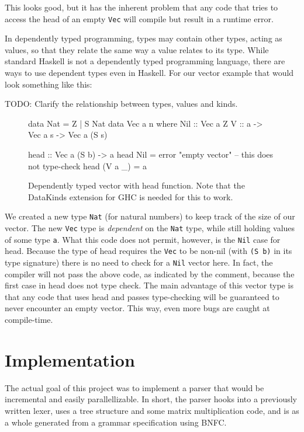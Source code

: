 \documentclass[a4paper,12pt,twosided]{report}
\begin{document}
This looks good, but it has the inherent problem that any code that tries to
access the head of an empty \texttt{Vec} will compile but result in a runtime error. 

In dependently typed programming, types may contain other types, acting as
values, so that they relate the same way a value relates to its type. While
standard Haskell is not a dependently typed programming language, there are ways
to use dependent types even in Haskell. For our vector example that would look
something like this:

TODO: Clarify the relationship between types, values and kinds. 
\begin{figure}[H]
\begin{code}
data Nat = Z | S Nat
data Vec a n where
    Nil :: Vec a Z
    V :: a -> Vec a s -> Vec a (S s)

head :: Vec a (S b) -> a
head Nil = error "empty vector" -- this does not type-check
head (V a _) = a
\end{code}
\caption{Dependently typed vector with head function. Note that the DataKinds
extension for GHC is needed for this to work.}
\end{figure}

We created a new type \texttt{Nat} (for natural numbers) to keep track of the
size of our vector. The new \texttt{Vec} type is \textit{dependent} on the
\texttt{Nat} type, while still holding values of some type \texttt{a}. What this
code does not permit, however, is the \texttt{Nil} case for head. Because the
type of head requires the \texttt{Vec} to be non-nil (with \texttt{(S b)} in its
type signature) there is no need to check for a \texttt{Nil} vector here. In
fact, the compiler will not pass the above code, as indicated by the comment,
because the first case in head does not type check. The main advantage of this
vector type is that any code that uses head and passes type-checking will be
guaranteed to never encounter an empty vector.  This way, even more bugs are
caught at compile-time.

%
%

\chapter{Implementation}
The actual goal of this project was to implement a parser that would be
incremental and easily parallellizable. In short, the parser hooks into a
previously written lexer, uses a tree structure and some matrix multiplication
code, and is as a whole generated from a grammar specification using BNFC.
\end{document}
